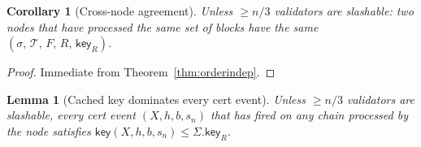 \documentclass{article}
\newcommand{\T}[0]{\ensuremath{\mathcal{T}}}
\newcommand{\key}{\mathsf{key}}
\theoremstyle{plain}
\newtheorem{corollary}{Corollary}
\newtheorem{lemma}{Lemma}
\theoremstyle{definition}
\theoremstyle{remark}
\begin{document}
\begin{corollary}[Cross-node agreement]\label{cor:agreement}
Unless $\geq n/3$ validators are slashable: two nodes that have processed the same set of blocks have the same $(\sigma,\, \T,\, F,\, R,\, \key_R)$.
\end{corollary}

\begin{proof}
Immediate from Theorem~\ref{thm:orderindep}.
\end{proof}

\begin{lemma}[Cached key dominates every cert event]\label{rev:lem:Rs-key-dominates}
Unless $\geq n/3$ validators are slashable, every cert event $(X, h, b, s_n)$ that has fired on any chain processed by the node satisfies $\key(X, h, b, s_n) \leq \Sigma.\key_R$.
\end{lemma}
\end{document}
